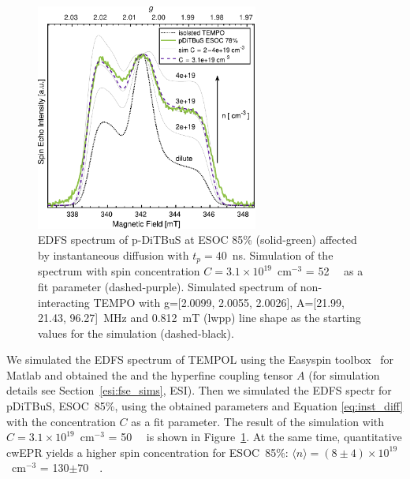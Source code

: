 \begin{figure}[ht]
\center
	\includegraphics[width=0.65\textwidth]{./pulse/figures/Figure_4.pdf}
	\caption{EDFS spectrum of p-DiTBuS at ESOC 85\% (solid-green) affected by instantaneous diffusion with $t_p=40$~ns. Simulation of the spectrum with spin concentration $C=3.1\times10^{19}$~cm$^{-3}$ = 52~\si{\milli\Molar}  as a fit parameter (dashed-purple). Simulated spectrum of non-interacting TEMPO with g=[2.0099, 2.0055, 2.0026], A=[21.99, 21.43, 96.27]~MHz and 0.812~mT (lwpp)  line shape as the starting values for the simulation (dashed-black). }
	\label{fig:Figure_4}
\end{figure}

We simulated the  EDFS spectrum of TEMPOL using the Easyspin toolbox~\cite{Stoll2006} for Matlab and obtained the   and the hyperfine coupling tensor $A$ (for simulation details see Section~\ref{esi:fse_sims}, ESI). Then we simulated the EDFS spectr for pDiTBuS, ESOC~85\%, using the obtained parameters and Equation \ref{eq:inst_diff} with  the concentration $C$ as a fit parameter. The result of the simulation with $C=3.1\times10^{19}$~cm$^{-3}$ = 50~\si{\milli\Molar}  is shown in Figure~\ref{fig:Figure_4}. At the same time, quantitative cwEPR yields a higher spin concentration for ESOC~85\%: $\langle n\rangle = (8\pm4)\times10^{19}$~cm$^{-3}$ = 130$\pm$70~\si{\milli\Molar}.\\

